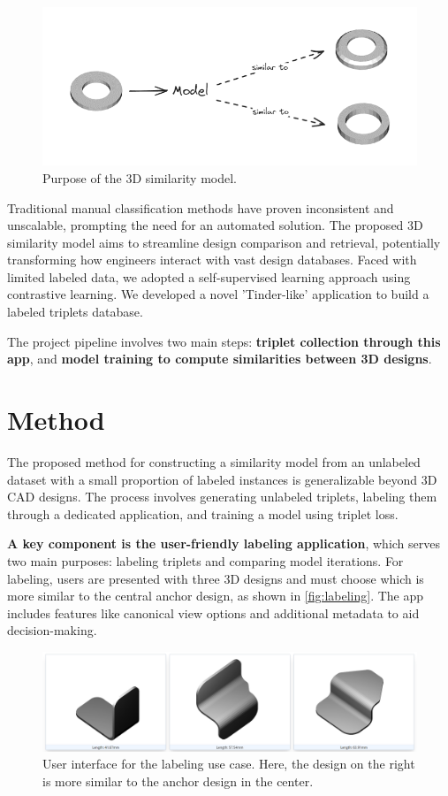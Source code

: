 \documentclass{article}
\begin{document}
\begin{figure}[h]
    \centering
    \includegraphics[width=0.8\columnwidth]{assets/similar-pieces.png}
    \caption{Purpose of the 3D similarity model.}
    \label{fig:purpose}
\end{figure}
Traditional manual classification methods have proven inconsistent and unscalable, prompting the need for an automated solution. The proposed 3D similarity model aims to streamline design comparison and retrieval, potentially transforming how engineers interact with vast design databases.
Faced with limited labeled data, we adopted a self-supervised learning approach using contrastive learning. We developed a novel 'Tinder-like' application to build a labeled triplets database.

The project pipeline involves two main steps: \textbf{triplet collection through this app}, and \textbf{model training to compute similarities between 3D designs}.

\section{Method}

The proposed method for constructing a similarity model from an unlabeled dataset with a small proportion of labeled instances is generalizable beyond 3D CAD designs. The process involves generating unlabeled triplets, labeling them through a dedicated application, and training a model using triplet loss.

\textbf{A key component is the user-friendly labeling application}, which serves two main purposes: labeling triplets and comparing model iterations. For labeling, users are presented with three 3D designs and must choose which is more similar to the central anchor design, as shown in \autoref{fig:labeling}. The app includes features like canonical view options and additional metadata to aid decision-making.

\begin{figure}[h]
    \centering
    \includegraphics[width=\columnwidth]{assets/tinder3d_labeling.png}
    \caption{User interface for the labeling use case. Here, the design on the right is more similar to the anchor design in the center.}
    \label{fig:labeling}
\end{figure}
\end{document}
